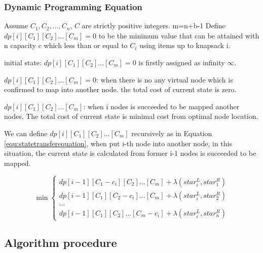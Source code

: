 \subsubsection{Dynamic Programming Equation}
\label{lab:DynamicProgrammingEquation}
Assume $C_1,C_2,\ldots,C_n$, $C$ are strictly positive integers. m=n+b-1 Define $dp[i][{C_1}][{C_2}] \ldots [{C_m}]=0$ to be the minimum value that can be attained with n capacity c which less than or equal to $C_i$ using items up to knapsack i.

initial state: $dp[i][{C_1}][{C_2}] \ldots [{C_m}]=0$ is firstly assigned as infinity $\infty$.

$dp[i][{C_1}][{C_2}] \ldots [{C_m}]=0$: when there is no any virtual node which is confirmed to map into another node. the total cost of current state is zero.

$dp[i][{C_1}][{C_2}] \ldots [{C_m}]$: when  i nodes is succeeded to be mapped another nodes. The total cost of current state is minimal cost from optimal node location.

We can define $dp[i][{C_1}][{C_2}] \ldots [{C_m}]$ recursively as in Equation \ref{equ:statetransferequation}, when put i-th node into another node, in this situation, the current state is calculated from former i-1 nodes is succeeded to be mapped.

\begin{equation}
\label{equ:statetransferequation}
\min \left\{ \begin{array}{l}
dp[i - 1][{C_1-c_i}][{C_2}] \ldots [{C_m}]+\lambda(star^L_i,star^R_1)\\
dp[i - 1][{C_1}][{C_2-c_i}] \ldots [{C_m}]+\lambda(star^L_i,star^R_2)\\
...\\
dp[i - 1][{C_1}][{C_2}] \ldots [{C_m-c_i}]+\lambda(star^L_i,star^R_n)
\end{array} \right.
\end{equation}



\subsection{Algorithm procedure}

